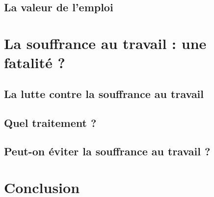 \documentclass{report}
\begin{document}
	\section{La valeur de l'emploi}

\chapter{La souffrance au travail : une fatalité ?}
	\section{La lutte contre la souffrance au travail}

	\section{Quel traitement ?}

	\section{Peut-on éviter la souffrance au travail ?}
    
\chapter*{Conclusion}
    \paragraph*{}
         
\end{document}

